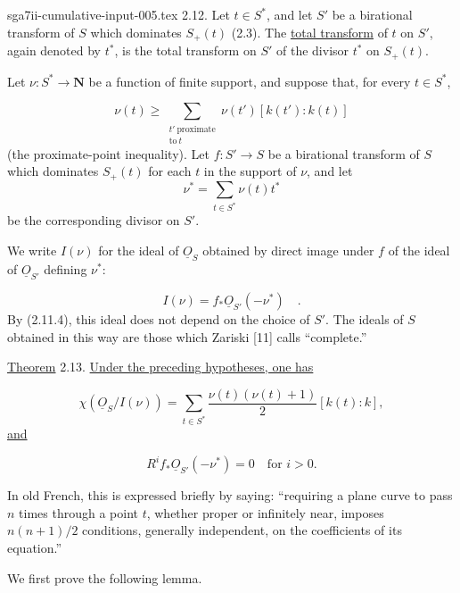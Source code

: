\begin{filecontents*}{sga7ii-cumulative-input-005.tex}
2.12. Let $t\in S^*$, and let $S'$ be a birational transform of $S$ which
dominates $S_+(t)$ (2.3).  The \underline{total transform} of $t$ on $S'$,
again denoted by $t^*$, is the total transform on $S'$ of the divisor $t^*$ on
$S_+(t)$.

Let $\nu:S^*\longrightarrow\mathbf N$ be a function of finite support, and
suppose that, for every $t\in S^*$,

\begin{equation}\tag{2.12.1}
\nu(t)\geq
\sum_{\substack{t'\ \mathrm{proximate}\\\mathrm{to}\ t}}
\nu(t')[k(t'):k(t)]
\end{equation}
(the proximate-point inequality).  Let $f:S'\longrightarrow S$ be a birational
transform of $S$ which dominates $S_+(t)$ for each $t$ in the support of $\nu$,
and let
\[
\nu^*=\sum_{t\in S^*}\nu(t)t^*
\]
be the corresponding divisor on $S'$.


We write $I(\nu)$ for the ideal of $\underline{O}_S$ obtained by direct image
under $f$ of the ideal of $\underline{O}_{S'}$ defining $\nu^*$:

\begin{equation*}
I(\nu)=f_*\underline{O}_{S'}(-\nu^*) \quad .
\end{equation*}
By (2.11.4), this ideal does not depend on the choice of $S'$.  The ideals of
$S$ obtained in this way are those which Zariski [11] calls ``complete.''

\underline{Theorem} 2.13. \underline{Under the preceding hypotheses, one has}

\begin{equation*}
\chi(\underline{O}_S/I(\nu))
=\sum_{t\in S^*}\frac{\nu(t)(\nu(t)+1)}2[k(t):k],
\end{equation*}
\underline{and}

\begin{equation*}
R^if_*\underline{O}_{S'}(-\nu^*)=0
\quad\text{for }i>0.
\end{equation*}

In old French, this is expressed briefly by saying: ``requiring a plane curve to
pass $n$ times through a point $t$, whether proper or infinitely near, imposes
$n(n+1)/2$ conditions, generally independent, on the coefficients of its
equation.''

We first prove the following lemma.


\end{filecontents*}

